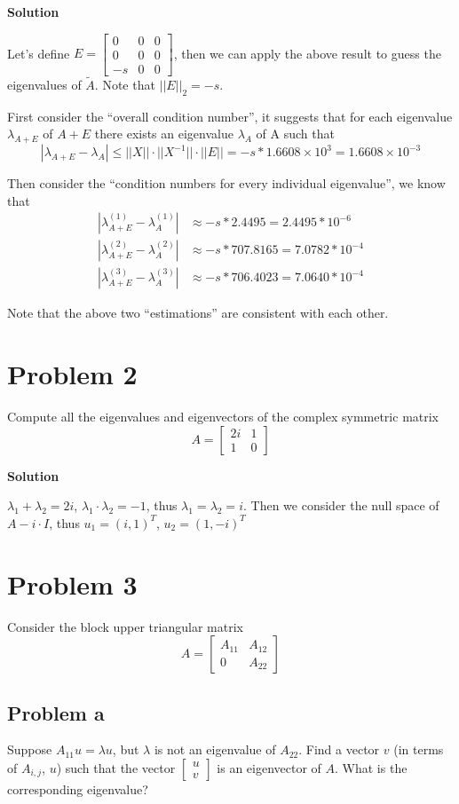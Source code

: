 \documentclass[12pt,oneside,a4paper]{article}
\newcommand{\problem}[1]
{
    \clearpage
    \section*{Problem {#1}}
}
\newcommand{\subproblem}[1]
{
    \subsection*{Problem {#1}}
}
\newcommand{\solution}
{
    \vspace{15pt}
    \noindent\ignorespaces\textbf{\large Solution}\par
}
\begin{document}
\solution
Let's define $E = \begin{bmatrix}
0 & 0 & 0\\
0 & 0 & 0\\
-s & 0 & 0
\end{bmatrix}$, then we can apply the above result to guess the eigenvalues of $\tilde{A}$. Note that $||E||_{2} = -s$.

First consider the ``overall condition number'', it suggests that for each eigenvalue $\lambda_{A + E}$ of $A + E$ there exists an eigenvalue $\lambda_{A}$ of A such that  
$$|\lambda_{A + E} - \lambda_{A}| \leq ||X|| \cdot ||X^{-1}|| \cdot ||E|| = -s * 1.6608 \times 10^{3} = 1.6608 \times 10^{-3}$$

Then consider the ``condition numbers for every individual eigenvalue'', we know that 
$$
\begin{aligned}
|\lambda_{A+E}^{(1)} - \lambda_{A}^{(1)}| &\approx -s * 2.4495 = 2.4495 * 10^{-6}\\
|\lambda_{A+E}^{(2)} - \lambda_{A}^{(2)}| &\approx -s * 707.8165 = 7.0782 * 10^{-4}\\
|\lambda_{A+E}^{(3)} - \lambda_{A}^{(3)}| &\approx -s * 706.4023 = 7.0640 * 10^{-4}
\end{aligned}
$$

Note that the above two ``estimations'' are consistent with each other.

\problem{2}
Compute all the eigenvalues and eigenvectors of the complex symmetric matrix
$$A = \begin{bmatrix}
2i & 1\\
1 & 0
\end{bmatrix}$$

\solution
$\lambda_{1} + \lambda_{2} = 2i$, $\lambda_{1} \cdot \lambda_{2} = -1$, thus $\lambda_{1} = \lambda_{2} = i$. Then we consider the null space of $A - i \cdot I$, thus $u_{1} = (i, 1)^{T}$, $u_{2} = (1, -i)^{T}$

\problem{3}
Consider the block upper triangular matrix
$$A = \begin{bmatrix}
A_{11} & A_{12}\\
0 & A_{22}
\end{bmatrix}$$

\subproblem{a}
Suppose $A_{11}u = \lambda u$, but $\lambda$ is not an eigenvalue of $A_{22}$. Find a vector $v$ (in terms of $A_{i,j}$, $u$) such that the vector $\begin{bmatrix} u \\ v\end{bmatrix}$ is an eigenvector of $A$. What is the corresponding eigenvalue?
\end{document}

